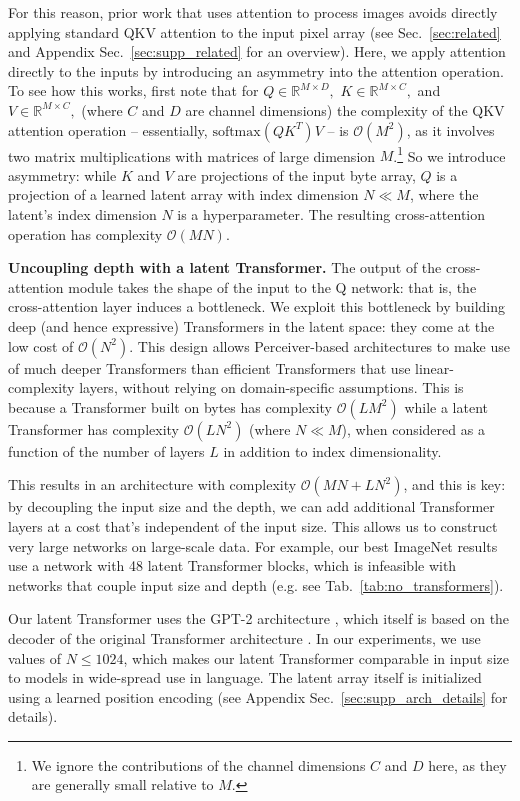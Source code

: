 For this reason, prior work that uses attention to process images avoids directly applying standard QKV attention to the input pixel array (see Sec.~\ref{sec:related} and Appendix Sec.~\ref{sec:supp_related} for an overview). Here, we apply attention directly to the inputs by introducing an asymmetry into the attention operation. To see how this works, first note that for $Q \in \mathbb{R}^{M \times D},$ $K \in \mathbb{R}^{M \times C},$ and $V \in \mathbb{R}^{M \times C},$ (where $C$ and $D$ are channel dimensions) the complexity of the QKV attention operation -- essentially, $\text{softmax}(QK^T) V$ -- is $\mathcal{O}(M^2)$, as it involves two matrix multiplications with matrices of large dimension $M$.\footnote{We ignore the contributions of the channel dimensions $C$ and $D$ here, as they are generally small relative to $M$.} So we introduce asymmetry: while $K$ and $V$ are projections of the input byte array, $Q$ is a projection of a learned latent array with index dimension $N \ll M$, where the latent's index dimension $N$ is a hyperparameter. The resulting cross-attention operation has complexity $\mathcal{O}(M N)$.

 \textbf{Uncoupling depth with a latent Transformer.} The output of the cross-attention module takes the shape of the input to the Q network: that is, the cross-attention layer induces a bottleneck. We exploit this bottleneck by building deep (and hence expressive) Transformers in the latent space: they come at the low cost of $\mathcal{O}(N^2)$. This design allows Perceiver-based architectures to make use of much deeper Transformers than efficient Transformers that use linear-complexity layers, without relying on domain-specific assumptions. This is because a Transformer built on bytes has complexity $\mathcal{O}(LM^2)$ while a latent Transformer has complexity $\mathcal{O}(LN^2)$ (where $N \ll M$), when considered as a function of the number of layers $L$ in addition to index dimensionality. 

This results in an architecture with complexity $\mathcal{O}(MN + LN^2)$, and this is key: by decoupling the input size and the depth, we can add additional Transformer layers at a cost that's independent of the input size. This allows us to construct very large networks on large-scale data. For example, our best ImageNet results use a network with 48 latent Transformer blocks, which is infeasible with networks that couple input size and depth (e.g. see Tab.~\ref{tab:no_transformers}).

Our latent Transformer uses the GPT-2 architecture \cite{radford2019language}, which itself is based on the decoder of the original Transformer architecture \cite{vaswani2017attention}. In our experiments, we use values of $N \le 1024$, which makes our latent Transformer comparable in input size to models in wide-spread use in language. The latent array itself is initialized using a learned position encoding \cite{gehring2017convolutional} (see Appendix Sec.~\ref{sec:supp_arch_details} for details).

